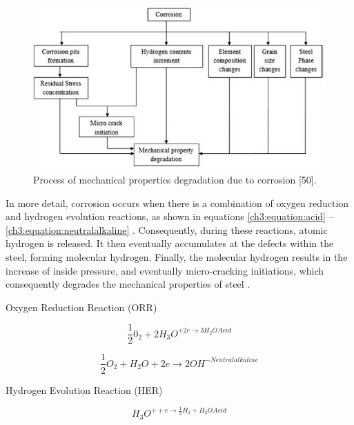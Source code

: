 \documentclass[12pt]{report}
\begin{document}
\begin{figure}[H]
    \centering
    \includegraphics[width=\textwidth]{process_of_mechanical_properties.jpg}
    \caption{Process of mechanical properties degradation due to corrosion [50].}
    \label{ch3:figure:degradation}
\end{figure}

In more detail, corrosion occurs when there is a combination of oxygen reduction and hydrogen evolution reactions, as shown in equations \ref{ch3:equation:acid} – \ref{ch3:equation:neutralalkaline} \cite{li2018effect}.  Consequently, during these reactions, atomic hydrogen is released. It then eventually accumulates at the defects within the steel, forming molecular hydrogen. Finally, the molecular hydrogen results in the increase of inside pressure, and eventually micro-cracking initiations, which consequently degrades the mechanical properties of steel \cite{whitman1924effect}.

\begin{center}
    Oxygen Reduction Reaction (ORR)
\end{center}

\begin{equation}
    \frac{1}{2}0_2 + 2H_3O^{+2e \rightarrow 3H_2OAcid}
    \label{ch3:equation:acid}
\end{equation}

\begin{equation}
    \frac{1}{2}O_2 + H_2O + 2e \rightarrow 2OH^{-Neutralalkaline}
\end{equation}

\begin{center}
    Hydrogen Evolution Reaction (HER)
\end{center}

\begin{equation}
    H_3O^{++e \rightarrow \frac{1}{2}H_2 + H_2OAcid}
\end{equation}
\end{document}
